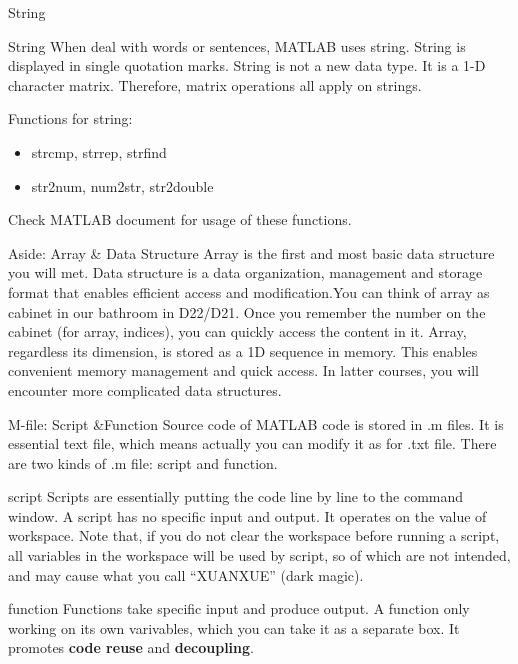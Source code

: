 \begin{frame}{String}
\begin{block}{String}
When deal with words or sentences, MATLAB uses string. String is displayed in single quotation marks. String is not a new data type. It is a 1-D character matrix. Therefore, matrix operations all apply on strings.
\end{block}
Functions for string:
\begin{itemize}
\item strcmp, strrep, strfind
\item str2num, num2str, str2double
\end{itemize}
Check MATLAB document for usage of these functions.
\end{frame}

\begin{frame}
\begin{block}{Aside: Array \& Data Structure\footnotemark}
Array is the first and most basic data structure you will met. Data structure is a data organization, management and storage format that enables efficient access and modification.\footnotemark You can think of array as cabinet in our bathroom in D22/D21. Once you remember the number on the cabinet (for array, indices), you can quickly access the content in it. Array, regardless its dimension, is stored as a 1D sequence in memory. This enables convenient memory management and quick access. In latter courses, you will encounter more complicated data structures. 
\end{block}
\end{frame}

\begin{frame}{M-file: Script \&Function}
Source code of MATLAB code is stored in .m files. It is essential text file, which means actually you can modify it as for .txt file. There are two kinds of .m file: script and function.
\begin{block}{script}
Scripts are essentially putting the code line by line to the command window. A script has no specific input and output. It operates on the value of workspace. Note that, if you do not clear the workspace before running a script, all variables in the workspace will be used by script, so of which are not intended, and may cause what you call ``XUANXUE'' (dark magic). \footnotemark
\end{block}
\begin{block}{function}
Functions take specific input and produce output. A function only working on its own varivables, which you can take it as a separate box. It promotes \textbf{code reuse} and \textbf{decoupling}.
\end{block}
\end{frame}

